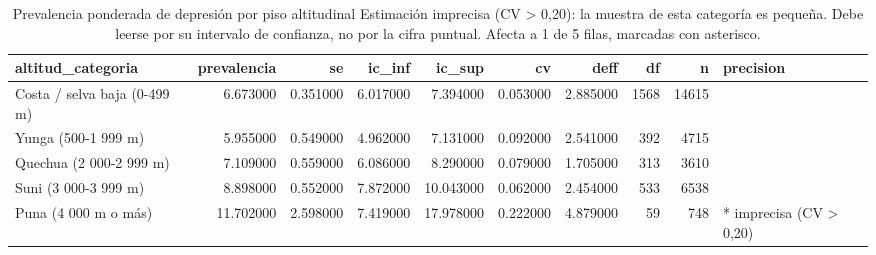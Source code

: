 \begin{table}[htbp]
\caption{Prevalencia ponderada de depresión por piso altitudinal Estimación imprecisa (CV > 0,20): la muestra de esta categoría es pequeña. Debe leerse por su intervalo de confianza, no por la cifra puntual. Afecta a 1 de 5 filas, marcadas con asterisco.}
\label{tab:tabla_33_prevalencia_por_altitud}
\begin{tabular}{lrrrrrrrrl}
\toprule
altitud\_categoria & prevalencia & se & ic\_inf & ic\_sup & cv & deff & df & n & precision \\
\midrule
Costa / selva baja (0-499 m) & 6.673000 & 0.351000 & 6.017000 & 7.394000 & 0.053000 & 2.885000 & 1568 & 14615 &  \\
Yunga (500-1 999 m) & 5.955000 & 0.549000 & 4.962000 & 7.131000 & 0.092000 & 2.541000 & 392 & 4715 &  \\
Quechua (2 000-2 999 m) & 7.109000 & 0.559000 & 6.086000 & 8.290000 & 0.079000 & 1.705000 & 313 & 3610 &  \\
Suni (3 000-3 999 m) & 8.898000 & 0.552000 & 7.872000 & 10.043000 & 0.062000 & 2.454000 & 533 & 6538 &  \\
Puna (4 000 m o más) & 11.702000 & 2.598000 & 7.419000 & 17.978000 & 0.222000 & 4.879000 & 59 & 748 & * imprecisa (CV > 0,20) \\
\bottomrule
\end{tabular}
\end{table}
